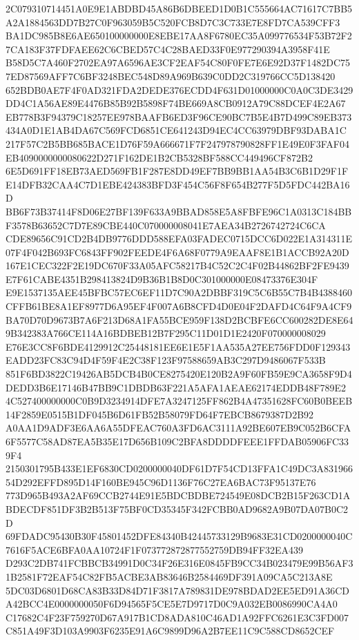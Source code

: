 \documentclass[UTF8,fontset=fandol,zihao=-4,a4paper]{ctexart}
\begin{document}
{{2C079310714451A0E9E1ABDBD45A86B6DBEED1D0B1C555664AC71617C7BB5A2A1884563DD7B27C0F963059B5C520FCB8D7C3C733E7E8FD7CA539CFF3
BA1DC985B8E6AE650100000000E8EBE17AA8F6780EC35A099776534F53B72F27CA183F37FDFAEE62C6CBED57C4C28BAED33F0E977290394A3958F41E
B58D5C7A460F2702EA97A6596AE3CF2EAF54C80F0FE7E6E92D37F1482DC757ED87569AFF7C6BF3248BEC548D89A969B639C0DD2C319766CC5D138420
652BDB0AE7F4F0AD321FDA2DEDE376ECDD4F631D01000000C0A0C3DE3429DD4C1A56AE89E4476B85B92B5898F74BE669A8CB0912A79C88DCEF4E2A67
EB778B3F94379C18257EE978BAAFB6ED3F96CE90BC7B5E4B7D499C89EB373434A0D1E1AB4DA67C569FCD6851CE641243D94EC4CC63979DBF93DABA1C
217F57C2B5BB685BACE1D76F59A666671F7F247978790828FF1E49E0F3FAF04EB4090000000080622D271F162DE1B2CB5328BF588CC449496CF872B2
6E5D691FF18EB73AED569FB1F287E8DD49EF7BB9BB1AA54B3C6B1D29F1FE14DFB32CAA4C7D1EBE424383BFD3F454C56F8F654B277F5D5FDC442BA16D
BB6F73B37414F8D06E27BF139F633A9BBAD858E5A8FBFE96C1A0313C184BBF3578B63652C7D7E89CBE440C070000008041E7AEA34B2726742724C6CA
CDE89656C91CD2B4DB9776DDD588EFA03FADEC0715DCC6D022E1A314311E07F4F042B693FC6843FF902FEEDE4F6A68F0779A9EAAF8E1B1ACCB92A20D
167E1CEC322F2E19DC670F33A05AFC58217B4C52C2C4F02B44862BF2FE9439E7F61CABE4351B298413824D9B36B1B8D0C301000000E08473376E304F
E9E1537135AEE45BFBC57EC6EF11D7C90A2DBBF319C5C6B55C7B4B4388460CFFB61BE8A1EF8977D6A95EF4F007A6B8CFD4D0E04F2DAFD4C64F9A4CF9
BA70D70D9673B7A6F213D68A1FA55BCE959F138D2BCBFE6CC600282DE8E649B342383A766CE114A16BDBEB12B7F295C11D01D1E2420F070000008029
E76E3CC8F6BDE4129912C25448181EE6E1E5F1AA535A27EE756FDD0F129343EADD23FC83C94D4F59F4E2C38F123F97588659AB3C297D9486067F533B
851F6BD3822C19426AB5DCB4B0CE8275420E120B2A9F60FB59E9CA3658F9D4DEDD3B6E17146B47BB9C1DBDB63F221A5AFA1AEAE62174EDDB48F789E2
4C527400000000C0B9D3234914DFE7A3247125FF862B4A47351628FC60B0BEEB14F2859E0515B1DF045B6D61FB52B58079FD64F7EBCB8679387D2B92
A0AA1D9ADF3E6AA6A55DFEAC760A3FD6AC3111A92BE607EB9C052B6CFA6F5577C58AD87EA5B35E17D656B109C2BFA8DDDDFEEE1FFDAB05906FC339F4
2150301795B433E1EF6830CD0200000040DF61D7F54CD13FFA1C49DC3A83196654D292EFFD895D14F160BE945C96D1136F76C27EA6BAC73F95137E76
773D965B493A2AF69CCB2744E91E5BDCBDBE724549E08DCB2B15F263CD1ABDECDF851DF3B2B513F75BF0CD35345F342FCBB0AD9682A9B07DA07B0C2D
69FDADC95430B30F45801452DFE84340B42445733129B9683E31CD0200000040C7616F5ACE6BFA0AA10724F1F073772872877552759DB94FF32EA439
D293C2DB741FCBBCB34991D0C34F26E316E0845FB9CC34B023479E99B56AF31B2581F72EAF54C82FB5ACBE3AB83646B2584469DF391A09CA5C213A8E
5DC03D6801D68CA83B33D84D71F3817A789831DE978BDAD2EE5ED91A36CDA42BCC4E0000000050F6D94565F5CE5E7D9717D0C9A032EB0086990CA4A0
C17682C4F23F759270D67A917B1CD8ADA810C46AD1A92FFC6261E3C3FD007C851A49F3D103A9903F6235E91A6C9899D96A2B7EE11C9C588CD8652CEF
}}
\end{document}
